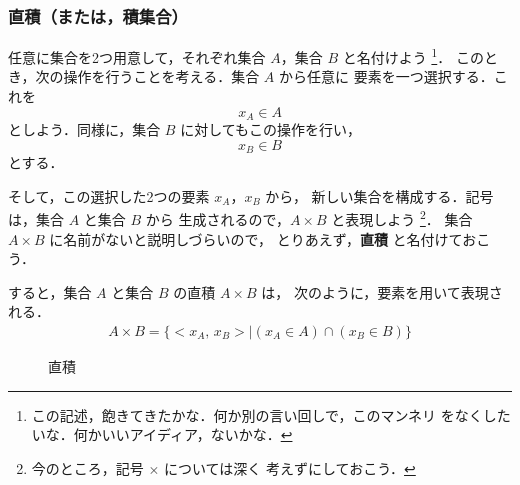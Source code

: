                 \subsubsection{直積（または，積集合）}
                    任意に集合を2つ用意して，それぞれ集合 $A$，集合 $B$ と名付けよう
                        \footnote{
                            この記述，飽きてきたかな．何か別の言い回しで，このマンネリ
                            をなくしたいな．何かいいアイディア，ないかな．
                        }．
                    このとき，次の操作を行うことを考える．集合 $A$ から任意に
                    要素を一つ選択する．これを
                        \begin{equation*}
                            x_{A} \in A
                        \end{equation*}
                    としよう．同様に，集合 $B$ に対してもこの操作を行い，
                        \begin{equation*}
                            x_{B} \in B
                        \end{equation*}
                    とする．

                    そして，この選択した2つの要素 $x_{A}$，$x_{B}$ から，
                    新しい集合を構成する．記号は，集合 $A$ と集合 $B$ から
                    生成されるので，$A\times B$ と表現しよう
                        \footnote{
                            今のところ，記号 $\times$ については深く
                            考えずにしておこう．
                        }．
                    集合 $A\times B$ に名前がないと説明しづらいので，
                    とりあえず，\textbf{直積} と名付けておこう．

                    すると，集合 $A$ と集合 $B$ の直積 $A\times B$ は，
                    次のように，要素を用いて表現される．
                    \begin{align}
                        A\times B  = \{<x_{A},\,x_{B}> | (x_{A} \in A) \cap (x_{B} \in B)\}
                    \end{align}

                        \begin{figure}[hbt]
                            \begin{center}
                                \caption{直積}
                                \label{fig:chokuseki}
                            \end{center}
                        \end{figure}



